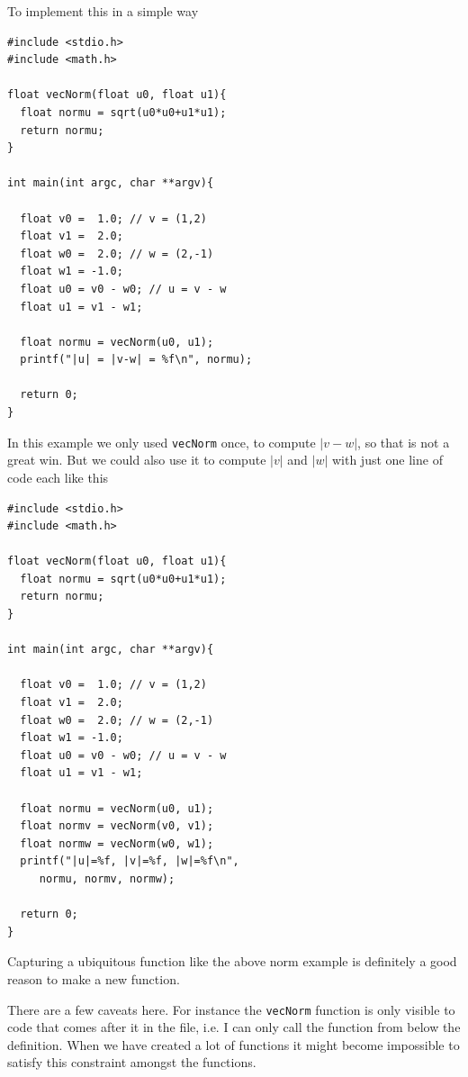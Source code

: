 To implement this in a simple way

\begin{verbatim}
#include <stdio.h>
#include <math.h>

float vecNorm(float u0, float u1){
  float normu = sqrt(u0*u0+u1*u1);
  return normu;
}

int main(int argc, char **argv){

  float v0 =  1.0; // v = (1,2)                                                 
  float v1 =  2.0;
  float w0 =  2.0; // w = (2,-1)                                                
  float w1 = -1.0;
  float u0 = v0 - w0; // u = v - w                                              
  float u1 = v1 - w1;

  float normu = vecNorm(u0, u1);
  printf("|u| = |v-w| = %f\n", normu);

  return 0;
}
\end{verbatim}
In this example we only used \texttt{vecNorm} once, to compute $|v-w|$, so that is not a great win. But we could also use it to compute $|v|$ and $|w|$ with just one line of code each like this

\begin{verbatim}
#include <stdio.h>
#include <math.h>

float vecNorm(float u0, float u1){
  float normu = sqrt(u0*u0+u1*u1);
  return normu;
}

int main(int argc, char **argv){

  float v0 =  1.0; // v = (1,2)                                                 
  float v1 =  2.0;
  float w0 =  2.0; // w = (2,-1)                                                
  float w1 = -1.0;
  float u0 = v0 - w0; // u = v - w                                              
  float u1 = v1 - w1;

  float normu = vecNorm(u0, u1);
  float normv = vecNorm(v0, v1);
  float normw = vecNorm(w0, w1);
  printf("|u|=%f, |v|=%f, |w|=%f\n", 
     normu, normv, normw);

  return 0;
}
\end{verbatim}
Capturing a ubiquitous function like the above norm example is definitely a good reason to make a new function.

There are a few caveats here. For instance the \texttt{vecNorm} function is only visible to code that comes after it in the file, i.e. I can only call the function from below the definition. When we have created a lot of functions it might become impossible to satisfy this constraint amongst the functions.

